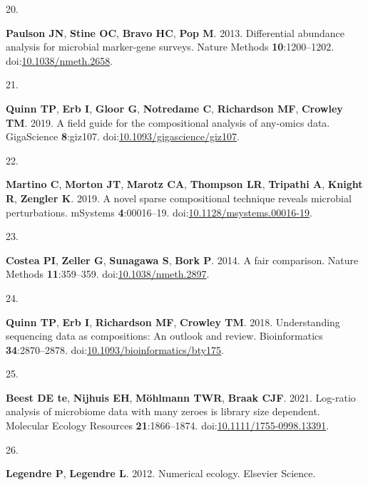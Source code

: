 \documentclass[
]{article}
\newlength{\cslhangindent}
\newlength{\csllabelwidth}
\newlength{\cslentryspacingunit} %
\newenvironment{CSLReferences}[2] %
 {%
  \setlength{\parindent}{0pt}
  \ifodd #1
  \let\oldpar\par
  \def\par{\hangindent=\cslhangindent\oldpar}
  \fi
  \setlength{\parskip}{#2\cslentryspacingunit}
 }%
 {}
\newcommand{\CSLLeftMargin}[1]{\parbox[t]{\csllabelwidth}{#1}}
\newcommand{\CSLRightInline}[1]{\parbox[t]{\linewidth - \csllabelwidth}{#1}\break}
\begin{document}
\begin{CSLReferences}{0}{1}
\leavevmode{}%
\CSLLeftMargin{20. }%
\CSLRightInline{\textbf{Paulson JN}, \textbf{Stine OC}, \textbf{Bravo
HC}, \textbf{Pop M}. 2013. Differential abundance analysis for microbial
marker-gene surveys. Nature Methods \textbf{10}:1200--1202.
doi:\href{https://doi.org/10.1038/nmeth.2658}{10.1038/nmeth.2658}.}

\leavevmode{}%
\CSLLeftMargin{21. }%
\CSLRightInline{\textbf{Quinn TP}, \textbf{Erb I}, \textbf{Gloor G},
\textbf{Notredame C}, \textbf{Richardson MF}, \textbf{Crowley TM}. 2019.
A field guide for the compositional analysis of any-omics data.
{GigaScience} \textbf{8}:giz107.
doi:\href{https://doi.org/10.1093/gigascience/giz107}{10.1093/gigascience/giz107}.}

\leavevmode{}%
\CSLLeftMargin{22. }%
\CSLRightInline{\textbf{Martino C}, \textbf{Morton JT}, \textbf{Marotz
CA}, \textbf{Thompson LR}, \textbf{Tripathi A}, \textbf{Knight R},
\textbf{Zengler K}. 2019. A novel sparse compositional technique reveals
microbial perturbations. {mSystems} \textbf{4}:00016--19.
doi:\href{https://doi.org/10.1128/msystems.00016-19}{10.1128/msystems.00016-19}.}

\leavevmode{}%
\CSLLeftMargin{23. }%
\CSLRightInline{\textbf{Costea PI}, \textbf{Zeller G}, \textbf{Sunagawa
S}, \textbf{Bork P}. 2014. A fair comparison. Nature Methods
\textbf{11}:359--359.
doi:\href{https://doi.org/10.1038/nmeth.2897}{10.1038/nmeth.2897}.}

\leavevmode{}%
\CSLLeftMargin{24. }%
\CSLRightInline{\textbf{Quinn TP}, \textbf{Erb I}, \textbf{Richardson
MF}, \textbf{Crowley TM}. 2018. Understanding sequencing data as
compositions: An outlook and review. Bioinformatics
\textbf{34}:2870--2878.
doi:\href{https://doi.org/10.1093/bioinformatics/bty175}{10.1093/bioinformatics/bty175}.}

\leavevmode{}%
\CSLLeftMargin{25. }%
\CSLRightInline{\textbf{Beest DE te}, \textbf{Nijhuis EH},
\textbf{Möhlmann TWR}, \textbf{Braak CJF}. 2021. Log-ratio analysis of
microbiome data with many zeroes is library size dependent. Molecular
Ecology Resources \textbf{21}:1866--1874.
doi:\href{https://doi.org/10.1111/1755-0998.13391}{10.1111/1755-0998.13391}.}

\leavevmode{}%
\CSLLeftMargin{26. }%
\CSLRightInline{\textbf{Legendre P}, \textbf{Legendre L}. 2012.
Numerical ecology. Elsevier Science.}


\end{CSLReferences}
\end{document}
